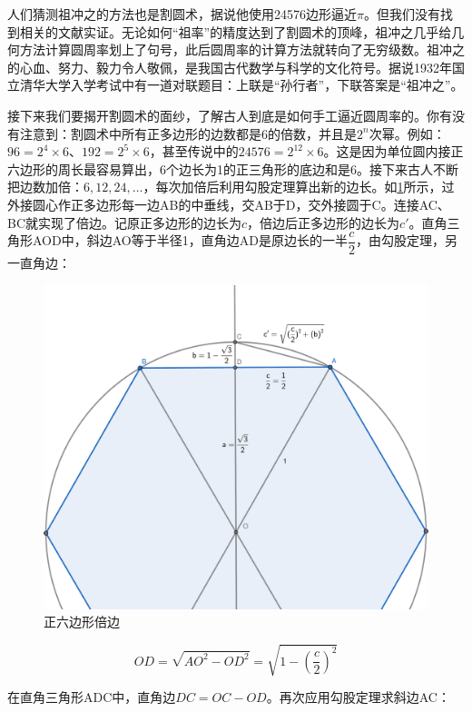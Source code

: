 \documentclass[b5paper]{ctexart}
\begin{document}
人们猜测祖冲之的方法也是割圆术，据说他使用24576边形逼近$\pi$。但我们没有找到相关的文献实证。无论如何“祖率”的精度达到了割圆术的顶峰，祖冲之几乎给几何方法计算圆周率划上了句号，此后圆周率的计算方法就转向了无穷级数。祖冲之的心血、努力、毅力令人敬佩，是我国古代数学与科学的文化符号。据说1932年国立清华大学入学考试中有一道对联题目：上联是“孙行者”，下联答案是“祖冲之”\cite{BaiHuawen}。

接下来我们要揭开割圆术的面纱，了解古人到底是如何手工逼近圆周率的。你有没有注意到：割圆术中所有正多边形的边数都是6的倍数，并且是$2^n$次幂。例如：$96 = 2^4 \times 6$、$192 = 2^5 \times 6$，甚至传说中的$24576 = 2^{12} \times 6$。这是因为单位圆内接正六边形的周长最容易算出，6个边长为1的正三角形的底边和是6。接下来古人不断把边数加倍：$6, 12, 24, \dotsc$，每次加倍后利用勾股定理算出新的边长。如\cref{fig:double-edges}所示，过外接圆心作正多边形每一边AB的中垂线，交AB于D，交外接圆于C。连接AC、BC就实现了倍边。记原正多边形的边长为$c$，倍边后正多边形的边长为$c'$。直角三角形AOD中，斜边AO等于半径1，直角边AD是原边长的一半$\dfrac{c}{2}$，由勾股定理，另一直角边：

\begin{figure}[htbp]
 \centering
 \includegraphics[scale=0.35]{img/double-edges}
 \caption{正六边形倍边}
 \label{fig:double-edges}
\end{figure}

\[
OD = \sqrt{AO^2 - OD^2} = \sqrt{1 - (\frac{c}{2})^2}
\]

在直角三角形ADC中，直角边$DC = OC - OD$。再次应用勾股定理求斜边AC：
\end{document}
